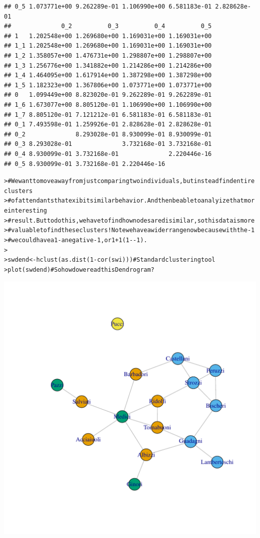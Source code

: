 \documentclass[12pt]{article}\usepackage[]{graphicx}\usepackage[]{color}
\makeatletter
\newcommand{\hlnum}[1]{\textcolor[rgb]{0.82,0.78,0.62}{#1}}%
\newcommand{\hlcom}[1]{\textcolor[rgb]{0.404,0.408,0.42}{#1}}%
\newcommand{\hlopt}[1]{\textcolor[rgb]{0.882,0.878,0.898}{#1}}%
\newcommand{\hlstd}[1]{\textcolor[rgb]{0.882,0.878,0.898}{#1}}%
\newcommand{\hlkwb}[1]{\textcolor[rgb]{0.902,0.675,0.196}{#1}}%
\newcommand{\hlkwd}[1]{\textcolor[rgb]{0.733,0.388,0.812}{#1}}%
\newenvironment{kframe}{%
 \def\at@end@of@kframe{}%
 \ifinner\ifhmode%
  \def\at@end@of@kframe{\end{minipage}}%
  \begin{minipage}{\columnwidth}%
 \fi\fi%
 \def\FrameCommand##1{\hskip\@totalleftmargin \hskip-\fboxsep
 \colorbox{shadecolor}{##1}\hskip-\fboxsep
     \hskip-\linewidth \hskip-\@totalleftmargin \hskip\columnwidth}%
 \MakeFramed {\advance\hsize-\width
   \@totalleftmargin\z@ \linewidth\hsize
   \@setminipage}}%
 {\par\unskip\endMakeFramed%
 \at@end@of@kframe}
\newenvironment{knitrout}{}{} %
\makeatother
\begin{document}
\begin{flushleft}
\begin{center}
\begin{knitrout}
\begin{kframe}
\begin{verbatim}
## 0_5 1.073771e+00 9.262289e-01 1.106990e+00 6.581183e-01 2.828628e-01
##              0_2          0_3          0_4          0_5
## 1   1.202548e+00 1.269680e+00 1.169031e+00 1.169031e+00
## 1_1 1.202548e+00 1.269680e+00 1.169031e+00 1.169031e+00
## 1_2 1.358057e+00 1.476731e+00 1.298807e+00 1.298807e+00
## 1_3 1.256776e+00 1.341882e+00 1.214286e+00 1.214286e+00
## 1_4 1.464095e+00 1.617914e+00 1.387298e+00 1.387298e+00
## 1_5 1.182323e+00 1.367806e+00 1.073771e+00 1.073771e+00
## 0   1.099449e+00 8.823020e-01 9.262289e-01 9.262289e-01
## 1_6 1.673077e+00 8.805120e-01 1.106990e+00 1.106990e+00
## 1_7 8.805120e-01 7.121212e-01 6.581183e-01 6.581183e-01
## 0_1 7.493598e-01 1.259926e-01 2.828628e-01 2.828628e-01
## 0_2              8.293028e-01 8.930099e-01 8.930099e-01
## 0_3 8.293028e-01              3.732168e-01 3.732168e-01
## 0_4 8.930099e-01 3.732168e-01              2.220446e-16
## 0_5 8.930099e-01 3.732168e-01 2.220446e-16
\end{verbatim}
\begin{alltt}
\hlstd{> }\hlcom{# We want to move away from just comparing two individuals, but instead find entire clusters}
\hlstd{> }\hlcom{#  of attendants that exibit similar behavior. And then be able to analyize that more interesting}
\hlstd{> }\hlcom{#  result. But to do this, we have to find how nodes are disimilar, so this data is more}
\hlstd{> }\hlcom{#  valuable to find these clusters! Note we have a wider range now because with the -1}
\hlstd{> }\hlcom{#  we could have a 1 - a negative -1, or 1+1 (1- -1).}
\hlstd{> }
\hlstd{> }\hlstd{swdend} \hlkwb{<-} \hlkwd{hclust}\hlstd{(}\hlkwd{as.dist}\hlstd{(}\hlnum{1}\hlopt{-}\hlkwd{cor}\hlstd{(swi)))} \hlcom{# Standard clustering tool}
\hlstd{> }\hlkwd{plot}\hlstd{(swdend)} \hlcom{# So how do we read this Dendrogram?}
\end{alltt}
\end{kframe}
\includegraphics[width=6in]{figure/Network_Properties-3} 

\end{knitrout}
\end{center}
\end{flushleft}
\end{document}
